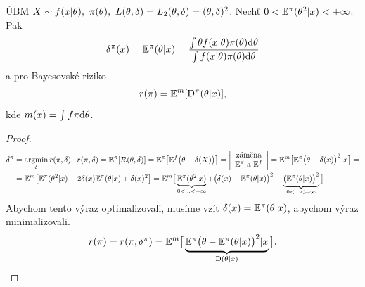 \begin{theorem}[Vyhazovací]
	ÚBM $X\sim f(x|\theta),~\pi(\theta),~L(\theta,\delta)=L_2(\theta,\delta)=(\theta,\delta)^2$. Nechť $0<\mathbb{E}^\pi(\theta^2|x)<+\infty$. Pak $$\delta^\pi(x)=\mathbb{E}^\pi(\theta|x)=\frac{\int\theta f(x|\theta)\pi(\theta)\mathrm{d}\theta}{\int f(x|\theta)\pi(\theta)\mathrm{d}\theta}$$
	a pro Bayesovské riziko 
	$$r(\pi)=\mathbb{E}^m[\mathrm{D}^\pi(\theta|x)],$$
	kde $m(x)=\int f\pi\mathrm{d}\theta$.
	\begin{proof}
		\[
		\begin{split}
		\delta^\pi&=\mathop{\mathrm{argmin}}\limits_{\delta} r(\pi,\delta),~r(\pi,\delta)=\mathbb{E}^\pi[\mathcal{R}(\theta,\delta)]=\mathbb{E}^\pi\big[\mathbb{E}^f\big(\theta-\delta(X)\big)\big]=\left|\begin{array}{c}
		\text{záměna} \\ \mathbb{E}^\pi\text{ a }\mathbb{E}^f		
		\end{array}
		\right|=\mathbb{E}^m\big[\mathbb{E}^\pi\big(\theta-\delta(x)\big)^2\big|x\big]=\\&=\mathbb{E}^m\big[\mathbb{E}^\pi(\theta^2|x)-2\delta(x)\mathbb{E}^\pi(\theta|x)+\delta(x)^2\big]=\mathbb{E}^m\big[\underbrace{\mathbb{E}^\pi(\theta^2|x)}_{0<...<+\infty}+\big(\delta(x)-\mathbb{E}^\pi(\theta|x)\big)^2-\underbrace{\big(\mathbb{E}^\pi(\theta|x)\big)^2}_{0<...<+\infty}\big]
		\end{split}
		\] Abychom tento výraz optimalizovali, musíme vzít $\delta(x)=\mathbb{E}^\pi(\theta|x)$, abychom výraz minimalizovali.
		$$ r(\pi)=r(\pi,\delta^\pi)=\mathbb{E}^m\big[\underbrace{\mathbb{E}^\pi\big(\theta-\mathbb{E}^\pi(\theta|x)\big)^2|x}_{\mathrm{D}(\theta|x)}\big].$$
	\end{proof}
\end{theorem}

